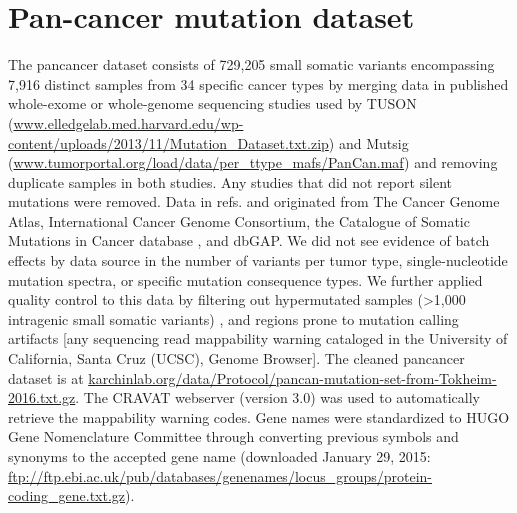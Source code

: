 \begingroup             
\let\clearpage\relax

\chapter{Pan-cancer mutation dataset}
\label{app:pancan_mutations}

The pancancer dataset consists of 729,205 small somatic variants encompassing 7,916 distinct samples from 34 specific cancer types by merging data in published whole-exome or whole-genome sequencing studies used by TUSON (\url{www.elledgelab.med.harvard.edu/wp-content/uploads/2013/11/Mutation_Dataset.txt.zip}) \cite{RN71} and Mutsig (\url{www.tumorportal.org/load/data/per_ttype_mafs/PanCan.maf}) \cite{RN14} and removing duplicate samples in both studies. Any studies that did not report silent mutations were removed. Data in refs. \cite{RN71} and \cite{RN14} originated from The Cancer Genome Atlas, International Cancer Genome Consortium, the Catalogue of Somatic Mutations in Cancer database \cite{RN97}, and dbGAP. We did not see evidence of batch effects by data source in the number of variants per tumor type, single-nucleotide mutation spectra, or specific mutation consequence types. We further applied quality control to this data by filtering out hypermutated samples (>1,000 intragenic small somatic variants) \cite{RN25}, and regions prone to mutation calling artifacts [any sequencing read mappability warning cataloged in the University of California, Santa Cruz (UCSC), Genome Browser]. The cleaned pancancer dataset is at \url{karchinlab.org/data/Protocol/pancan-mutation-set-from-Tokheim-2016.txt.gz}. The CRAVAT webserver (version 3.0) was used to automatically retrieve the mappability warning codes. Gene names were standardized to HUGO Gene Nomenclature Committee through converting previous symbols and synonyms to the accepted gene name (downloaded January 29, 2015: \url{ftp://ftp.ebi.ac.uk/pub/databases/genenames/locus_groups/protein-coding_gene.txt.gz}). 

\endgroup